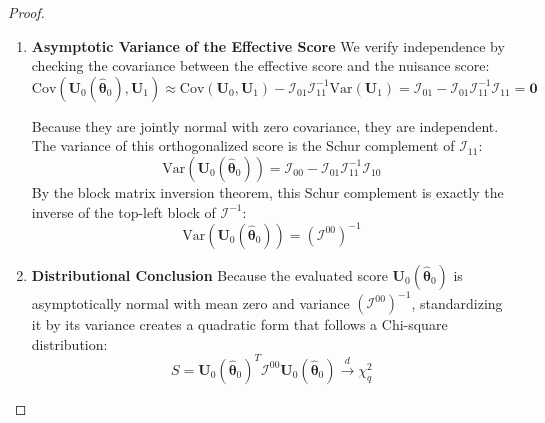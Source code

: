 \documentclass[
  letterpaper,
  DIV=11,
  numbers=noendperiod]{scrreprt}
\renewcommand{\[}{\begin{equation}}
\renewcommand{\]}{\end{equation}}
\theoremstyle{definition}
\theoremstyle{plain}
\theoremstyle{plain}
\theoremstyle{plain}
\theoremstyle{definition}
\theoremstyle{plain}
\theoremstyle{remark}
\begin{document}
\begin{proof}
\begin{enumerate}
  Substituting the estimation error from Step 2:
  \[\mathbf{U}_0(\hat{\boldsymbol{\theta}}_0) \approx \mathbf{U}_0 - \mathcal{I}_{01} \mathcal{I}_{11}^{-1} \mathbf{U}_1\]

  This quantity is the \textbf{Effective Score}. Geometrically, it
  represents the residual of \(\mathbf{U}_0\) after projecting it
  orthogonally onto the nuisance score \(\mathbf{U}_1\).
\item
  \textbf{Asymptotic Variance of the Effective Score} We verify
  independence by checking the covariance between the effective score
  and the nuisance score:
  \[\text{Cov}(\mathbf{U}_0(\hat{\boldsymbol{\theta}}_0), \mathbf{U}_1) \approx \text{Cov}(\mathbf{U}_0, \mathbf{U}_1) - \mathcal{I}_{01} \mathcal{I}_{11}^{-1} \text{Var}(\mathbf{U}_1) = \mathcal{I}_{01} - \mathcal{I}_{01} \mathcal{I}_{11}^{-1} \mathcal{I}_{11} = \mathbf{0}\]

  Because they are jointly normal with zero covariance, they are
  independent. The variance of this orthogonalized score is the Schur
  complement of \(\mathcal{I}_{11}\):
  \[\text{Var}(\mathbf{U}_0(\hat{\boldsymbol{\theta}}_0)) = \mathcal{I}_{00} - \mathcal{I}_{01} \mathcal{I}_{11}^{-1} \mathcal{I}_{10}\]
  By the block matrix inversion theorem, this Schur complement is
  exactly the inverse of the top-left block of \(\mathcal{I}^{-1}\):
  \[\text{Var}(\mathbf{U}_0(\hat{\boldsymbol{\theta}}_0)) = (\mathcal{I}^{00})^{-1}\]
\item
  \textbf{Distributional Conclusion} Because the evaluated score
  \(\mathbf{U}_0(\hat{\boldsymbol{\theta}}_0)\) is asymptotically normal
  with mean zero and variance \((\mathcal{I}^{00})^{-1}\), standardizing
  it by its variance creates a quadratic form that follows a Chi-square
  distribution:
  \[S = \mathbf{U}_0(\hat{\boldsymbol{\theta}}_0)^T \mathcal{I}^{00} \mathbf{U}_0(\hat{\boldsymbol{\theta}}_0) \xrightarrow{d} \chi^2_q\]
\end{enumerate}

\end{proof}
\end{document}

